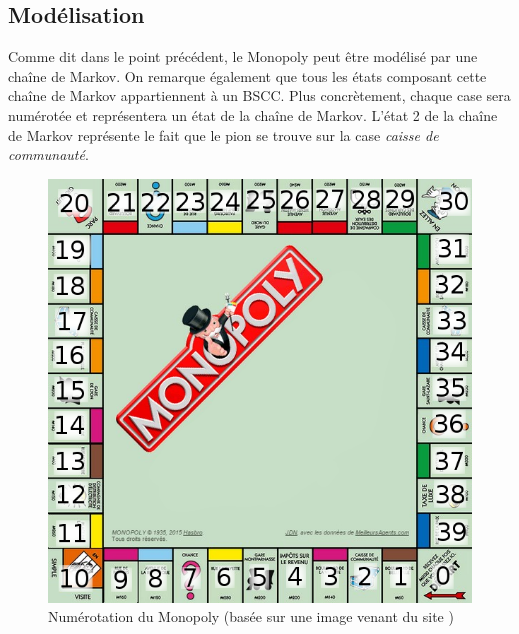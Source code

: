 \documentclass[letterpaper]{article}
\begin{document}
  \subsection{Modélisation}
    \label{modeliation_monopoly}
    Comme dit dans le point précédent, le Monopoly peut être modélisé par une chaîne de
    Markov.  On remarque également que tous les états composant cette chaîne de Markov
    appartiennent à un BSCC.  Plus concrètement, chaque case sera 
    numérotée et représentera un état de la chaîne de Markov.  L'état 2 de la chaîne
    de Markov représente le fait que le pion se trouve sur la case \textit{caisse de
    communauté}.
    \begin{figure}[h]
      \centering
      \includegraphics[scale=0.4]{./Images/Monopoly.png}
	\caption{Numérotation du Monopoly (basée sur une image venant du site
	\cite{IMG_Monopoly})}
    \end{figure}
\end{document}
